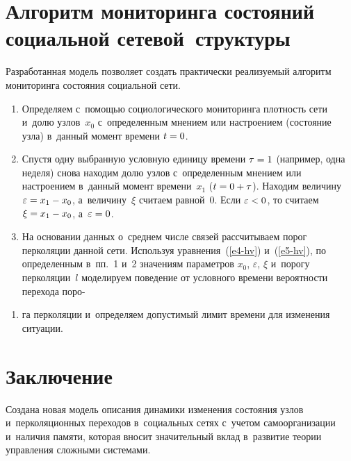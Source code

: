 \begin{multicols}{2}
\vspace*{-4pt}

\section{Алгоритм мониторинга состояний социальной сетевой~структуры}

\vspace*{-2pt}

  Разработанная модель позволяет создать практически реализуемый алгоритм 
мониторинга состояния социальной сети.\\[-12pt]
\begin{enumerate}[1.]
\item Определяем с~помощью социологического мониторинга плотность сети 
и~долю узлов~$x_0$ с~определенным мнением или настроением (состояние 
узла) в~данный момент времени $t\hm=0$.\\[-15pt]
\item Спустя одну выбранную условную единицу времени $\tau\hm=1$ 
(например, одна неделя) снова находим долю узлов с~определенным мнением 
или настроением в~данный момент времени~$x_1$ ($t\hm=0\hm +\tau$). 
Находим величину $\varepsilon\hm=x_1 \hm- x_0$, а~величину~$\xi$ считаем 
равной~0. Если $\varepsilon\hm<0$, то считаем $\xi\hm= x_1 \hm- x_0$, 
а~$\varepsilon\hm=0$.\\[-15pt]
\item На основании данных о~среднем числе связей рассчитываем порог 
перколяции данной сети. Используя уравнения~(\ref{e4-hv}) и~(\ref{e5-hv}), по 
определенным в~пп.~1 и~2 значениям параметров $x_0$, $\varepsilon$, 
$\xi$ и~порогу перколяции~$l$ моделируем поведение от условного времени 
вероятности перехода поро-\linebreak\vspace*{-12pt}
\end{enumerate}

\begin{enumerate}
\item[\,]
га перколяции и~определяем допустимый лимит 
времени для изменения ситуации.
\end{enumerate}

\vspace*{-6pt}

\section{Заключение}

  Создана новая модель описания динамики изменения состояния узлов 
и~перколяционных переходов в~социальных сетях с~учетом самоорганизации 
и~наличия памяти, которая вносит \mbox{значительный} вклад в~развитие тео\-рии 
управления сложными системами.
  

\end{multicols}
